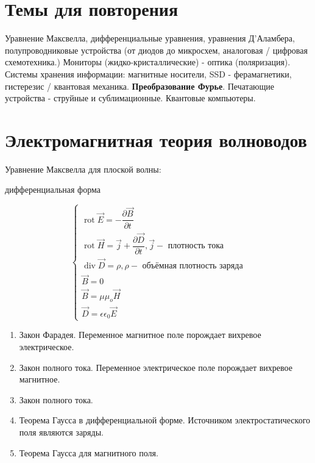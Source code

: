 

\DeclareMathOperator{\rot}{\text{rot}}
\DeclareMathOperator{\divFiz}{\text{div}}
\DeclareMathOperator{\grad}{\text{grad}}


\section*{Темы для повторения}

Уравнение Максвелла, дифференциальные уравнения, уравнения Д'Аламбера, полупроводниковые устройства (от диодов до микросхем, аналоговая / цифровая схемотехника.) Мониторы (жидко-кристаллические) - оптика (поляризация). Системы хранения информации: магнитные носители, SSD - ферамагнетики, гистерезис / квантовая механика. \textbf{Преобразование Фурье}. Печатающие устройства - струйные и сублимационные. Квантовые компьютеры.

\section{Электромагнитная теория волноводов}

Уравнение Максвелла для плоской волны:

\begin{remark}
	дифференциальная форма
\end{remark}

\[
\begin{cases}
	\rot \vec{E} = - \dfrac{\partial \vec{B}}{\partial t} \\
	\rot \vec{H} = \vec{j} + \dfrac{\partial \vec{D}}{\partial t}, \vec{j} - \text{ плотность тока} \\
	\divFiz \vec{D} = \rho, \rho - \text{ объёмная плотность заряда} \\
	\vec{B} = 0 \\
	\vec{B} = \mu \mu_o \vec{H} \\
	\vec{D} = \epsilon \epsilon_0 \vec{E}
\end{cases}
\]

\begin{enumerate}
	\item Закон Фарадея. Переменное магнитное поле порождает вихревое электрическое.
	\item Закон полного тока. Переменное электрическое поле порождает вихревое магнитное.
	\item Закон полного тока.
	\item Теорема Гаусса в дифференциальной форме. Источником электростатического поля являются заряды.
	\item Теорема Гаусса для магнитного поля.
\end{enumerate}

